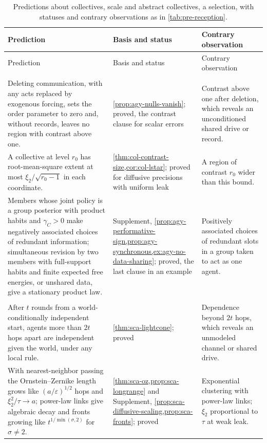 \begingroup
\footnotesize
\setlength{\tabcolsep}{4pt}
\begin{longtable}{@{}>{\raggedright\arraybackslash}p{6.5cm}>{\raggedright\arraybackslash}p{3.9cm}>{\raggedright\arraybackslash}p{5.1cm}@{}}
\caption{Predictions about collectives, scale and abstract collectives, a selection, with statuses and contrary observations as in \cref{tab:pre-reception}.}\label{tab:pre-collectives}\\
\toprule
Prediction & Basis and status & Contrary observation\\
\midrule
\endfirsthead
\toprule
Prediction & Basis and status & Contrary observation\\
\midrule
\endhead
\bottomrule
\endfoot
\multicolumn{3}{@{}l}{\textit{Collectives, interaction and agency, \cref{hyp:int-h1}}}\\
Deleting communication, with any acts replaced by exogenous forcing, sets the order parameter to zero and, without records, leaves no region with contrast above one. & \cref{prop:agy-nulls-vanish}; proved, the contrast clause for scalar errors & Contrast above one after deletion, which reveals an unconditioned shared drive or record.\\
\addlinespace
A collective at level $r_0$ has root-mean-square extent at most $\xi_2/\sqrt{r_0-1}$ in each coordinate. & \cref{thm:col-contrast-size,cor:col-lstar}; proved for diffusive precisions with uniform leak & A region of contrast $r_0$ wider than this bound.\\
\addlinespace
Members whose joint policy is a group posterior with product habits and $\gamma_C>0$ make negatively associated choices of redundant information; simultaneous revision by two members with full-support habits and finite expected free energies, or unshared data, give a stationary product law. & Supplement, \cref{prop:agy-performative-sign,prop:agy-synchronous,ex:agy-no-data-sharing}; proved, the last clause in an example & Positively associated choices of redundant slots in a group taken to act as one agent.\\
\midrule
\multicolumn{3}{@{}l}{\textit{Scale, \cref{hyp:int-h4}}}\\
After $t$ rounds from a world-conditionally independent start, agents more than $2t$ hops apart are independent given the world, under any local rule. & \cref{thm:sca-lightcone}; proved & Dependence beyond $2t$ hops, which reveals an unmodeled channel or shared drive.\\
\addlinespace
With nearest-neighbor passing the Ornstein--Zernike length grows like $(a/\varepsilon)^{1/2}$ hops and $\xi_2^2/\tau\to a$; power-law links give algebraic decay and fronts growing like $t^{1/\min(\sigma,2)}$ for $\sigma\ne2$. & \cref{thm:sca-oz,prop:sca-longrange} and Supplement, \cref{prop:sca-diffusive-scaling,prop:sca-fronts}; proved & Exponential clustering with power-law links; $\xi_2$ proportional to $\tau$ at weak leak.\\

\end{longtable}
